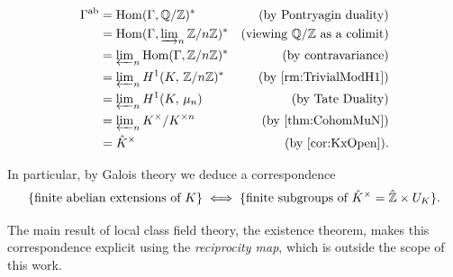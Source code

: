 \documentclass[a4paper, oneside]{memoir}
\begin{document}
\begin{align*}
    \Gamma^{\text{ab}} & = \operatorname{Hom}(\Gamma, \mathbb{Q}/\mathbb{Z})^*                              & \text{(by Pontryagin duality)}        \\
                       & = \operatorname{Hom}(\Gamma, \varinjlim_n\nolimits \mathbb{Z}/n\mathbb{Z})^*          & \text{(viewing $\mathbb{Q}/\mathbb{Z}$ as a colimit)} \\
                       & = \varprojlim_n\nolimits \operatorname{Hom}(\Gamma, \mathbb{Z}/n\mathbb{Z})^*         & \text{(by contravariance)}            \\
                       & = \varprojlim_n\nolimits H^{1}( K, \, \mathbb{Z}/n\mathbb{Z} )^*             & \text{(by \ref{rm:TrivialModH1})}     \\
                       & = \varprojlim_n\nolimits H^{1}( K, \, \mu_n )             & \text{(by Tate Duality)}              \\
                       & = \varprojlim_n\nolimits K^{\times} / K^{\times n} & \text{(by \ref{thm:CohomMuN})}        \\
                       & = \hat{K}^{\times}                                  & \text{(by \ref{cor:KxOpen})}.
\end{align*}

In particular, by Galois theory we deduce a correspondence
\[
    \{\text{finite abelian extensions of }K\} \iff \{\text{finite subgroups of }\hat{K}^{\times} = \hat{\mathbb{Z}} \times U_K\}
    .\]

The main result of local class field theory, the existence theorem, makes this correspondence explicit using the \textit{reciprocity map}, which is outside the scope of this work.

\nocite{*}
\printbibliography
\end{document}
